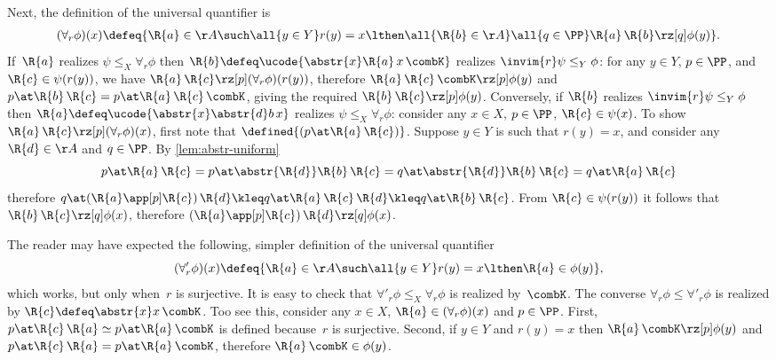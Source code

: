 Next, the definition of the universal quantifier is
%
\begin{multline*}
  (\forall_r \phi)(x) \defeq
   \{\R{a} \in \AA \such
     \all{y \in Y} r(y) = x \lthen
     \all{\R{b} \in \AA} \all{q \in \PP}
     \R{a} \, \R{b} \rz[q] \phi(y)
   \}.
\end{multline*}
%
If~$\R{a}$ realizes $\psi \leq_X \forall_r \phi$ then $\R{b} \defeq \ucode{\abstr{x} \R{a} \, x \, \combK}$ realizes $\invim{r}\psi \leq_Y \phi$:
%
for any $y \in Y$, $p \in \PP$, and $\R{c} \in \psi(r(y))$, we have $\R{a} \, \R{c} \rz[p] (\forall_r \phi)(r(y))$, therefore $\R{a} \, \R{c} \, \combK \rz[p] \phi(y)$ and $p \at \R{b} \, \R{c} = p \at \R{a} \, \R{c} \, \combK$, giving the required $\R{b} \, \R{c} \rz[p] \phi(y)$.
%
Conversely, if $\R{b}$ realizes $\invim{r}\psi \leq_Y \phi$ then $\R{a} \defeq \ucode{\abstr{x} \abstr{d} b \, x}$ realizes $\psi \leq_X \forall_r \phi$: consider any $x \in X$, $p \in \PP$, $\R{c} \in \psi(x)$. To show $\R{a} \, \R{c} \rz[p] (\forall_r \phi)(x)$, first note that $\defined{(p \at \R{a} \, \R{c})}$. Suppose $y \in Y$ is such that $r(y) = x$, and consider any $\R{d} \in \AA$ and $q \in \PP$.
%
By \cref{lem:abstr-uniform}
%
\begin{equation*}
  p \at \R{a} \, \R{c} =
  p \at \abstr{\R{d}} \R{b} \, \R{c} =
  q \at \abstr{\R{d}} \R{b} \, \R{c} =
  q \at \R{a} \, \R{c}
\end{equation*}
%
therefore
%
$
  q \at (\R{a} \app[p] \R{c}) \, \R{d} \kleq
  q \at \R{a} \, \R{c} \, \R{d} \kleq
  q \at \R{b} \, \R{c}
$.
%
From $\R{c} \in \psi(r(y))$ it follows that $\R{b} \, \R{c} \rz[q] \phi(x)$, therefore $(\R{a} \app[p] \R{c}) \, \R{d} \rz[q] \phi(x)$.

The reader may have expected the following, simpler definition of the universal quantifier
%
\begin{equation}
  \label{eq:alternative-forall}%
  (\forall'_r \phi)(x) \defeq
   \{\R{a} \in \AA \such
     \all{y \in Y} r(y) = x \lthen
     \R{a} \in \phi(y)
   \},
\end{equation}
%
which works, but only when~$r$ is surjective.
%
It is easy to check that $\forall'_r \phi \leq_X \forall_r \phi$ is realized by~$\combK$.
The converse $\forall_r \phi \leq \forall'_r \phi$ is realized by $\R{c} \defeq \abstr{x} x \, \combK$. Too see this, consider any $x \in X$, $\R{a} \in (\forall_r \phi)(x)$ and $p \in \PP$.
First, $p \at \R{c} \, \R{a} \simeq p \at \R{a} \, \combK$  is defined because~$r$ is surjective.
Second, if $y \in Y$ and $r(y) = x$ then $\R{a} \, \combK \rz[p] \phi(y)$ and $p \at \R{c} \, \R{a} = p \at \R{a} \, \combK$, therefore $\R{a} \, \combK \in \phi(y)$.

